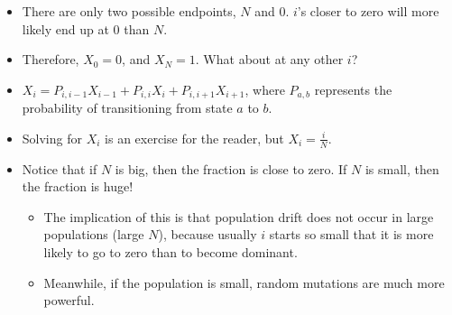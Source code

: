 \documentclass[10pt]{article}
\begin{document}
\begin{itemize}
	\item There are only two possible endpoints, $N$ and $0$.  $i$'s closer to zero will more likely end up at $0$ than $N$.
	\item Therefore, $X_0 = 0$, and $X_N = 1$.  What about at any other $i$?
	\item $X_i = P_{i, i - 1}X_{i - 1} + P_{i, i}X_{i} + P_{i, i + 1}X_{i + 1}$, where $P_{a, b}$ represents the probability of transitioning from state $a$ to $b$.
	\item Solving for $X_i$ is an exercise for the reader, but $X_i = \frac{i}{N}$.
	\item Notice that if $N$ is big, then the fraction is close to zero.  If $N$ is small, then the fraction is huge!  
    \begin{itemize}
        \item The implication of this is that population drift does not occur in large populations (large $N$), because usually $i$ starts so small that it is more likely to go to zero than to become dominant.
        \item Meanwhile, if the population is small, random mutations are much more powerful.
    \end{itemize}
\end{itemize}
\end{document}
